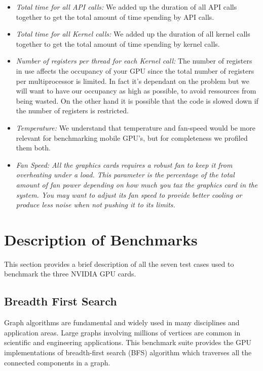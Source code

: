 \documentclass[paper=a4, fontsize=11pt]{scrartcl}
\numberwithin{equation}{section}		%
\numberwithin{figure}{section}			%
\numberwithin{table}{section}				%
\begin{document}
\begin{itemize}
\item
\textit{Total time for all API calls: } We added up the duration of all API calls together to get the total amount of time spending by API calls. 

\item
\textit{Total time for all Kernel calls: } We added up the duration of all kernel calls together to get the total amount of time spending by kernel calls. 

\item
\textit{Number of registers per thread for each Kernel call: } The number of registers in use affects the occupancy of your GPU since the total number of registers per multiprocessor is limited. In fact it's dependant on the problem but we will want to have our occupancy as high as possible, to avoid ressources from being wasted. On the other hand it is possible that the code is slowed down if the number of registers is restricted.

\item
\textit{Temperature: } We understand that temperature and fan-speed would be more relevant for benchmarking mobile GPU's, but for completeness we profiled them both.

\item
\textit{Fan Speed: All the graphics cards requires a robust fan to keep it from overheating under a load. This parameter is the percentage of the total amount of fan power depending on how much you tax the graphics card in the system. You may want to adjust its fan speed to provide better cooling or produce less noise when not pushing it to its limits.}
\end{itemize}



\newpage
\section{Description of Benchmarks}
This section provides a brief description of all the seven test cases used 
to benchmark the three NVIDIA GPU cards.

\subsection{Breadth First Search}
Graph algorithms are fundamental and widely used in many disciplines and application areas. Large graphs involving millions of vertices are common in scientific and engineering applications. This benchmark suite provides the GPU implementations of breadth-first search (BFS) algorithm which traverses all the connected components in a graph.
\end{document}
